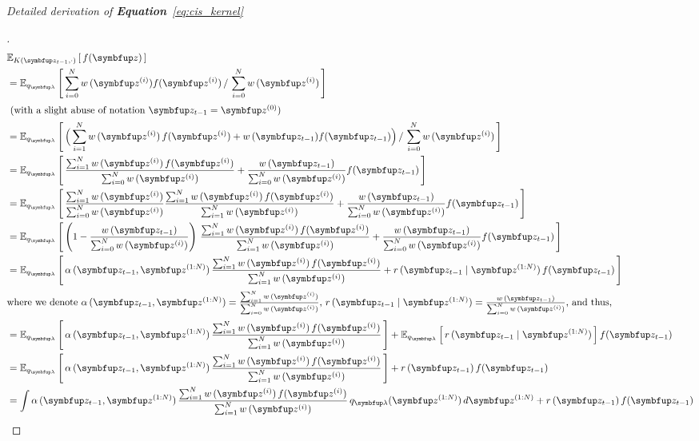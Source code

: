 

\textit{Detailed derivation of \textbf{Equation}~\eqref{eq:cis_kernel}}
\begin{proof}[\unskip\nopunct]
\begin{align}
  &\Esub{K(\vz_{t-1}, \cdot)}{f(\vz)} \\
  &= \Esub{q_{\vlambda}}{
      \sum^{N}_{i=0} w\,(\vz^{(i)}) f(\vz^{(i)}) 
      \,/\,
      \sum^{N}_{i=0} w\,(\vz^{(i)})
  } \\
  \intertext{
    (with a slight abuse of notation \(\vz_{t-1} = \vz^{(0)}\))
  }
  &= \Esub{q_{\vlambda}}{
    \Big(
    \sum^{N}_{i=1} w\,(\vz^{(i)})\,f(\vz^{(i)}) + w\,(\vz_{t-1}) f(\vz_{t-1})
    \Big)
      \,/\,
      \sum^{N}_{i=0} w\,(\vz^{(i)})
  } \\
  &= \Esub{q_{\vlambda}}{
    \frac{
      \sum^{N}_{i=1} w\,(\vz^{(i)})\,f(\vz^{(i)})
    }
    {
      \sum^{N}_{i=0} w\,(\vz^{(i)})
    }
    +
    \frac{w\,(\vz_{t-1})}{\sum^{N}_{i=0} w\,(\vz^{(i)})} f(\vz_{t-1})
  } \\
  &= \Esub{q_{\vlambda}}{
    \frac{
      \sum^{N}_{i=1} w\,(\vz^{(i)})  
    }
    {
      \sum^{N}_{i=0} w\,(\vz^{(i)})  
    }
    \frac{
      \sum^{N}_{i=1} w\,(\vz^{(i)})\,f(\vz^{(i)})
    }
    {
      \sum^{N}_{i=1} w\,(\vz^{(i)})
    }
    +
    \frac{w\,(\vz_{t-1})}{\sum^{N}_{i=0} w\,(\vz^{(i)})} f(\vz_{t-1})
  } \\
  &= \Esub{q_{\vlambda}}{
    \left(
    1 - \frac{
       w\,(\vz_{t-1}) 
    }
    {
      \sum^{N}_{i=0} w\,(\vz^{(i)})  
    }
    \right)\,
    \frac{
      \sum^{N}_{i=1} w\,(\vz^{(i)})\,f(\vz^{(i)})
    }
    {
      \sum^{N}_{i=1} w\,(\vz^{(i)})
    }
    +
    \frac{w\,(\vz_{t-1})}{\sum^{N}_{i=0} w\,(\vz^{(i)})} f(\vz_{t-1})
  } \\
  &= \Esub{q_{\vlambda}}{
    \alpha\,(\vz_{t-1}, \vz^{(1:N)}) \,
    \frac{
      \sum^{N}_{i=1} w\,(\vz^{(i)})\,f(\vz^{(i)})
    }
    {
      \sum^{N}_{i=1} w\,(\vz^{(i)})
    }
    +
    r\,(\vz_{t-1}\mid\vz^{(1:N)}) \, f(\vz_{t-1})
  } \\ 
  \intertext{where we denote
    \(
    \alpha\,(\vz_{t-1}, \vz^{(1:N)}) =
    \frac{
      \sum^{N}_{i=1} w\,(\vz^{(i)})  
    }
    {
      \sum^{N}_{i=0} w\,(\vz^{(i)})  
    }
  \),
  \(
  r\,(\vz_{t-1}\mid\vz^{(1:N)}) = \frac{w\,(\vz_{t-1})}{\sum^{N}_{i=0} w\,(\vz^{(i)})}
  \), and thus,
  }
%
  &= \Esub{q_{\vlambda}}{
    \alpha\,(\vz_{t-1}, \vz^{(1:N)}) \,
    \frac{
      \sum^{N}_{i=1} w\,(\vz^{(i)})\,f(\vz^{(i)})
    }
    {
      \sum^{N}_{i=1} w\,(\vz^{(i)})
    }
  }
    +
 \Esub{q_{\vlambda}}{
   r\,(\vz_{t-1}\mid\vz^{(1:N)})
 } f(\vz_{t-1}) \\
%
  &= \Esub{q_{\vlambda}}{
    \alpha\,(\vz_{t-1}, \vz^{(1:N)}) \,
    \frac{
      \sum^{N}_{i=1} w\,(\vz^{(i)})\,f(\vz^{(i)})
    }
    {
      \sum^{N}_{i=1} w\,(\vz^{(i)})
    }
  }
    +
   r\,(\vz_{t-1})\,f(\vz_{t-1}) \\
%
  &=  
   \int \alpha\,(\vz_{t-1}, \vz^{(1:N)}) \,
    \frac{
      \sum^{N}_{i=1} w\,(\vz^{(i)})\,f(\vz^{(i)})
    }
    {
      \sum^{N}_{i=1} w\,(\vz^{(i)})
    } \,
    q_{\vlambda}(\vz^{(1:N)})\,d\vz^{(1:N)}
    +
   r\,(\vz_{t-1})\,f(\vz_{t-1})
\end{align}
\end{proof}


